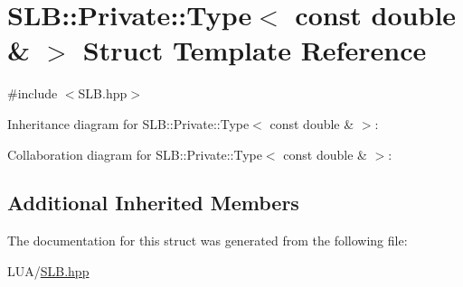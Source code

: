 \hypertarget{structSLB_1_1Private_1_1Type_3_01const_01double_01_6_01_4}{}\section{S\+LB\+:\+:Private\+:\+:Type$<$ const double \& $>$ Struct Template Reference}
\label{structSLB_1_1Private_1_1Type_3_01const_01double_01_6_01_4}


{\ttfamily \#include $<$S\+L\+B.\+hpp$>$}



Inheritance diagram for S\+LB\+:\+:Private\+:\+:Type$<$ const double \& $>$\+:


Collaboration diagram for S\+LB\+:\+:Private\+:\+:Type$<$ const double \& $>$\+:
\subsection*{Additional Inherited Members}


The documentation for this struct was generated from the following file\+:\begin{DoxyCompactItemize}
\item 
L\+U\+A/\hyperlink{SLB_8hpp}{S\+L\+B.\+hpp}\end{DoxyCompactItemize}

